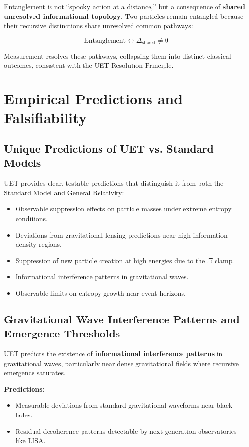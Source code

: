 \documentclass[12pt,a4paper]{article}
\begin{document}
Entanglement is not “spooky action at a distance,” but a consequence of \textbf{shared unresolved informational topology}. Two particles remain entangled because their recursive distinctions share unresolved common pathways:

\[
\text{Entanglement} \leftrightarrow \Delta_{\text{shared}} \neq 0
\]

Measurement resolves these pathways, collapsing them into distinct classical outcomes, consistent with the UET Resolution Principle.
\section{Empirical Predictions and Falsifiability}

\subsection{Unique Predictions of UET vs. Standard Models}

UET provides clear, testable predictions that distinguish it from both the Standard Model and General Relativity:

\begin{itemize}
    \item Observable suppression effects on particle masses under extreme entropy conditions.
    \item Deviations from gravitational lensing predictions near high-information density regions.
    \item Suppression of new particle creation at high energies due to the \(\Xi\) clamp.
    \item Informational interference patterns in gravitational waves.
    \item Observable limits on entropy growth near event horizons.
\end{itemize}

\subsection{Gravitational Wave Interference Patterns and Emergence Thresholds}

UET predicts the existence of \textbf{informational interference patterns} in gravitational waves, particularly near dense gravitational fields where recursive emergence saturates.

\textbf{Predictions:}
\begin{itemize}
    \item Measurable deviations from standard gravitational waveforms near black holes.
    \item Residual decoherence patterns detectable by next-generation observatories like LISA.
\end{itemize}
\end{document}
